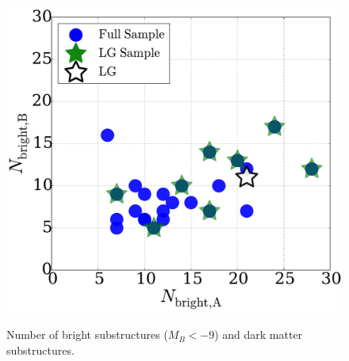 \documentclass{emulateapj}
\begin{document}

\begin{figure}
\centering
\includegraphics[width=\hsize]{n_structure.pdf}\\
\caption{Number of bright substructures ($M_{B}<-9$) and dark matter
  substructures.}
\label{fig:nstructure}
\end{figure}
\end{document}

